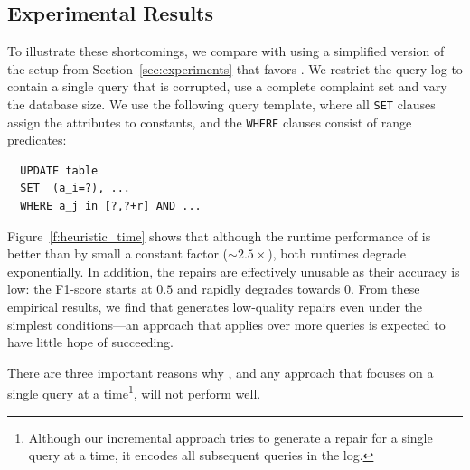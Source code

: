\subsection{Experimental Results}

To illustrate these shortcomings, we compare \dt with \sys using a simplified version of the setup from Section~\ref{sec:experiments} that favors \dt.
We restrict the query log to contain a single query that is corrupted, use a complete complaint set  and vary the database size.
We use the following query template, where all \texttt{SET} clauses assign the attributes to constants,
and the \texttt{WHERE} clauses consist of range predicates:

{\scriptsize
\begin{verbatim}
  UPDATE table
  SET  (a_i=?), ...
  WHERE a_j in [?,?+r] AND ...
\end{verbatim}
}

Figure~\ref{f:heuristic_time} shows that although the runtime performance of \dt is better than \sys by small a constant factor ($\sim 2.5 \times$),
both runtimes degrade exponentially.
In addition, the \dt repairs are effectively unusable as their accuracy is low: the F1-score starts at $0.5$ and rapidly degrades towards $0$.
From these empirical results, we find that \dt generates low-quality repairs even under the simplest conditions---an approach
that applies \dt over more queries is expected to have little hope of succeeding.



There are three important reasons why \dt, and any approach that focuses on a single query at a 
time\footnote{Although our incremental approach tries to generate a repair for a single query at a time, it encodes all subsequent queries in the log.}, will not perform well.


